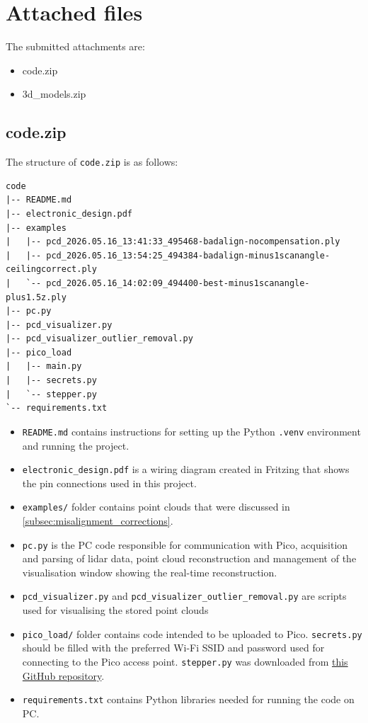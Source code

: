 \chapter{Attached files}
The submitted attachments are:
\begin{itemize}
    \item code.zip
    \item 3d\_models.zip
\end{itemize}

\section{code.zip}
The structure of \texttt{code.zip} is as follows:
\begin{verbatim}
code
|-- README.md
|-- electronic_design.pdf
|-- examples
|   |-- pcd_2026.05.16_13:41:33_495468-badalign-nocompensation.ply
|   |-- pcd_2026.05.16_13:54:25_494384-badalign-minus1scanangle-ceilingcorrect.ply
|   `-- pcd_2026.05.16_14:02:09_494400-best-minus1scanangle-plus1.5z.ply
|-- pc.py
|-- pcd_visualizer.py
|-- pcd_visualizer_outlier_removal.py
|-- pico_load
|   |-- main.py
|   |-- secrets.py
|   `-- stepper.py
`-- requirements.txt
\end{verbatim}
\begin{itemize}
    \item \texttt{README.md} contains instructions for setting up the Python \texttt{.venv} environment and running the project.
    \item \texttt{electronic\_design.pdf} is a wiring diagram created in Fritzing that shows the pin connections used in this project.
    \item \texttt{examples/} folder contains point clouds that were discussed in \cref{subsec:misalignment_corrections}.
    \item \texttt{pc.py} is the PC code responsible for communication with Pico, acquisition and parsing of \gls{lidar} data, point cloud reconstruction and management of the visualisation window showing the real-time reconstruction.
    \item \texttt{pcd\_visualizer.py} and \texttt{pcd\_visualizer\_outlier\_removal.py} are scripts used for visualising the stored point clouds
    \item \texttt{pico\_load/} folder contains code intended to be uploaded to Pico. \texttt{secrets.py} should be filled with the preferred Wi-Fi SSID and password used for connecting to the Pico access point. \texttt{stepper.py} was downloaded from \href{https://github.com/redoxcode/micropython-stepper/blob/main/src/stepper/__init__.py?}{this GitHub repository}.
    \item \texttt{requirements.txt} contains Python libraries needed for running the code on PC.
\end{itemize}

